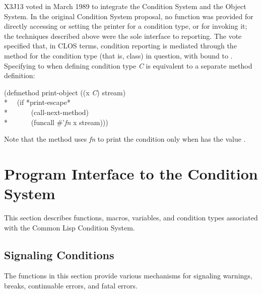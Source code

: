 X3J13 voted in March 1989  to integrate the
Condition System and the Object System.
In the original Condition System proposal,
no function was provided for directly accessing or setting the printer for
a condition type, or for invoking it; the techniques described above were
the sole interface to reporting.  The vote specified that, in CLOS terms,
condition reporting is mediated through the 
method for the condition type (that is, class) in question, with 
bound to .  Specifying  to
 when defining
condition type \emph{C} is equivalent to a separate method definition:
\begin{lisp}
(defmethod print-object ((x \emph{C}) stream) \\*
~~(if *print-escape* \\*
~~~~~~(call-next-method) \\*
~~~~~~(funcall \#'\emph{fn} x stream)))
\end{lisp}
Note that the method uses \emph{fn} to print the condition
only when  has the value .



\section{Program Interface to the Condition System}

This section describes functions, macros, variables, and condition
types associated with the Common Lisp Condition System.


\subsection{Signaling Conditions}
\label{SIGNALLING-CONDITIONS}


The functions in this section provide various mechanisms
for signaling warnings, breaks, continuable errors, and fatal errors.


